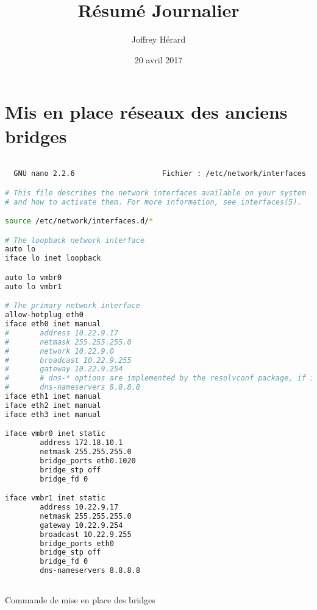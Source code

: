 \documentclass[french]{article}
\begin{document}
\title{Résumé Journalier}
\author{Joffrey Hérard}
\date{20 avril 2017} 

\maketitle
\section{Mis en place réseaux des anciens bridges}


\begin{lstlisting}[language=bash,caption={}]

  GNU nano 2.2.6                    Fichier : /etc/network/interfaces                                              

# This file describes the network interfaces available on your system
# and how to activate them. For more information, see interfaces(5).

source /etc/network/interfaces.d/*

# The loopback network interface
auto lo
iface lo inet loopback

auto lo vmbr0
auto lo vmbr1

# The primary network interface
allow-hotplug eth0
iface eth0 inet manual
#       address 10.22.9.17
#       netmask 255.255.255.0
#       network 10.22.9.0
#       broadcast 10.22.9.255
#       gateway 10.22.9.254
#       # dns-* options are implemented by the resolvconf package, if installed
#       dns-nameservers 8.8.8.8
iface eth1 inet manual
iface eth2 inet manual
iface eth3 inet manual

iface vmbr0 inet static
        address 172.18.10.1
        netmask 255.255.255.0
        bridge_ports eth0.1020
        bridge_stp off
        bridge_fd 0

iface vmbr1 inet static
        address 10.22.9.17
        netmask 255.255.255.0
        gateway 10.22.9.254
        broadcast 10.22.9.255
        bridge_ports eth0
        bridge_stp off
        bridge_fd 0
        dns-nameservers 8.8.8.8



\end{lstlisting}
Commande de mise en place des bridges
\end{document}
